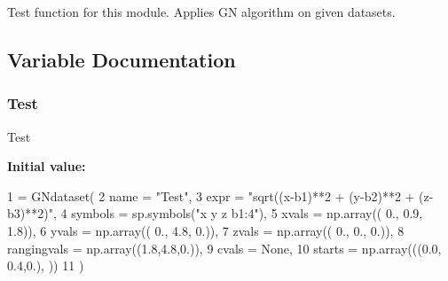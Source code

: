 \begin{DoxyVerb}Test function for this module. Applies GN algorithm on given datasets.\end{DoxyVerb}
 

\subsection{Variable Documentation}
\mbox{\label{namespace_gauss_newton_ab085d1bf4cff8b1045750706b11f8662}} 
\subsubsection{\texorpdfstring{Test}{Test}}
{\footnotesize\ttfamily Test}

{\bfseries Initial value\+:}
\begin{DoxyCode}
1 =  GNdataset(
2        name = \textcolor{stringliteral}{"Test"},
3        expr = \textcolor{stringliteral}{"sqrt((x-b1)**2 + (y-b2)**2 + (z-b3)**2)"},
4     symbols = sp.symbols(\textcolor{stringliteral}{"x y z b1:4"}),
5       xvals = np.array(( 0., 0.9, 1.8)),
6       yvals = np.array(( 0., 4.8, 0.)),
7       zvals = np.array(( 0., 0., 0.)),
8       rangingvals = np.array((1.8,4.8,0.)),
9       cvals = \textcolor{keywordtype}{None},
10      starts = np.array(((0.0, 0.4,0.), ))
11 )
\end{DoxyCode}
